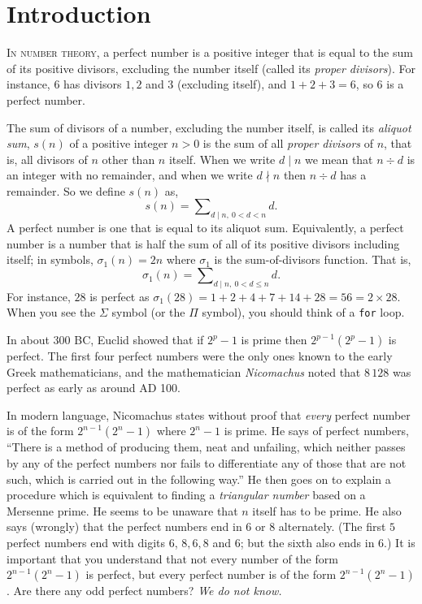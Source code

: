 \section{Introduction}

\lettrine[lines=3]{I}{n number theory}, a perfect number is a
positive integer that is equal to the sum of its positive divisors,
excluding the number itself (called its \emph{proper divisors}). For instance, $6$ has divisors $1, 2$ and
$3$ (excluding itself), and $1 + 2 + 3 = 6$, so $6$ is a perfect number.

The sum of divisors of a number, excluding the number itself, is
called its \emph{aliquot sum}, $s (n)$ of a positive integer $n>0$
is the sum of all \emph{proper divisors} of $n$, that is, all
divisors of $n$ other than $n$ itself.  When we write $d\mid n$ we mean
that $n \div d$ is an integer with no remainder, and when we write
$d \nmid n$ then $n \div d$ has a remainder.  So we define $s(n)$ as,
$$s (n)=\sum\nolimits_{d\mid n,\ 0<d < n}d.$$
A perfect number is one that is equal to its aliquot sum. Equivalently, a perfect number
is a number that is half the sum of all of its positive divisors including itself; in symbols,
$\sigma_1 (n) = 2 n$ where $\sigma_1$
is the sum-of-divisors function.
That is,
$$\sigma_1 (n)=\sum\nolimits_{d\mid n,\ 0<d\le n}d.$$
For instance, $28$ is perfect as
$\sigma_1(28) = 1 + 2 + 4 + 7 + 14 + 28 = 56 = 2 \times 28$.
When you see the $\Sigma$ symbol (or the $\Pi$ symbol), you should think of a \texttt{for} loop.

In about 300\xspace BC, Euclid
showed that if $2^p - 1$
is prime then $2^{p-1}(2^p -1)$
is perfect.  The first four perfect numbers were the only ones known
to the early Greek mathematicians, and the mathematician \emph{Nicomachus}
noted that $8\,128$ was perfect as early as around AD\xspace 100.

In modern language, Nicomachus states without proof that \emph{every}
perfect number is of the form $2^{n-1}(2^n-1)$ where $2^n-1$ is
prime.  He says of perfect numbers, ``There is a method of producing
them, neat and unfailing, which neither passes by any of the perfect
numbers nor fails to differentiate any of those that are not such,
which is carried out in the following way.'' He then goes on to
explain a procedure which is equivalent to finding a \emph{triangular
number} based on a Mersenne prime.  He seems to be unaware that $n$
itself has to be prime. He also says (wrongly) that the perfect
numbers end in $6$ or $8$ alternately. (The first $5$ perfect numbers
end with digits $6$, $8, 6, 8$ and $6$; but the sixth also ends in
$6$.) It is important that you understand that not every number of
the form $2^{n-1}(2^n-1)$ is perfect, but every perfect number is
of the form $2^{n-1}(2^n-1)$.
Are there any odd perfect numbers? \emph{We do not know.}

